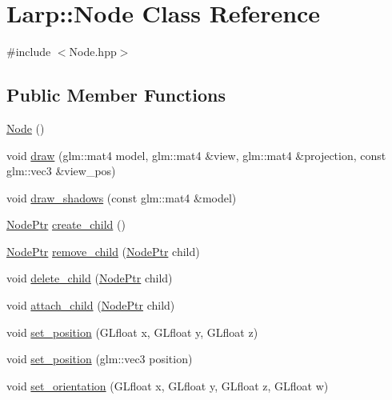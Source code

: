 \hypertarget{classLarp_1_1Node}{}\section{Larp\+:\+:Node Class Reference}
\label{classLarp_1_1Node}


{\ttfamily \#include $<$Node.\+hpp$>$}

\subsection*{Public Member Functions}
\begin{DoxyCompactItemize}
\item 
\hyperlink{classLarp_1_1Node_a2cb8fc6e60b762b02226d73489ac5099}{Node} ()
\item 
void \hyperlink{classLarp_1_1Node_a4c4720e80bc9b15416b26b5531a85ee6}{draw} (glm\+::mat4 model, glm\+::mat4 \&view, glm\+::mat4 \&projection, const glm\+::vec3 \&view\+\_\+pos)
\item 
void \hyperlink{classLarp_1_1Node_aed3c73242d809e5e64868becbe7e7069}{draw\+\_\+shadows} (const glm\+::mat4 \&model)
\item 
\hyperlink{namespaceLarp_a171c1dc8b70cfb441b15d7386780db23}{Node\+Ptr} \hyperlink{classLarp_1_1Node_a3ad8fa3c292ce51ce8ac0922c96608f1}{create\+\_\+child} ()
\item 
\hyperlink{namespaceLarp_a171c1dc8b70cfb441b15d7386780db23}{Node\+Ptr} \hyperlink{classLarp_1_1Node_accd1116b2d35500ae519588d07f1f30e}{remove\+\_\+child} (\hyperlink{namespaceLarp_a171c1dc8b70cfb441b15d7386780db23}{Node\+Ptr} child)
\item 
void \hyperlink{classLarp_1_1Node_a091f322ac9a2dcfcb81ab38bdff61399}{delete\+\_\+child} (\hyperlink{namespaceLarp_a171c1dc8b70cfb441b15d7386780db23}{Node\+Ptr} child)
\item 
void \hyperlink{classLarp_1_1Node_abbf90d7e84f9c8144bc5532d288ce3ae}{attach\+\_\+child} (\hyperlink{namespaceLarp_a171c1dc8b70cfb441b15d7386780db23}{Node\+Ptr} child)
\item 
void \hyperlink{classLarp_1_1Node_a44070f7bb06cdca4fafbdf65f0d6118e}{set\+\_\+position} (G\+Lfloat x, G\+Lfloat y, G\+Lfloat z)
\item 
void \hyperlink{classLarp_1_1Node_a8eef7a9829817bfe9b2ff3bed5b0c3a8}{set\+\_\+position} (glm\+::vec3 position)
\item 
void \hyperlink{classLarp_1_1Node_ad1b12b56ba7c708d1ce51ec0762f7476}{set\+\_\+orientation} (G\+Lfloat x, G\+Lfloat y, G\+Lfloat z, G\+Lfloat w)

\end{DoxyCompactItemize}
